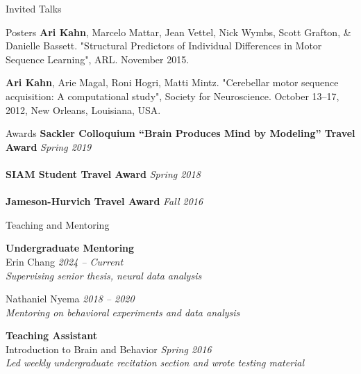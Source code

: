 \documentclass{resume} %
\begin{document}
\begin{rSection}{Invited Talks}
\begin{rSection}{Posters}
\textbf{Ari Kahn}, Marcelo Mattar, Jean Vettel, Nick Wymbs, Scott Grafton, \& Danielle Bassett. "Structural Predictors of Individual Differences in Motor Sequence Learning", ARL. November 2015.

\textbf{Ari Kahn}, Arie Magal, Roni Hogri, Matti Mintz. "Cerebellar motor sequence acquisition: A computational study", Society for Neuroscience. October 13--17, 2012, New Orleans, Louisiana, USA.
\end{rSection}

\end{rSection}

\begin{rSection}{Awards}
    \textbf{Sackler Colloquium ``Brain Produces Mind by Modeling'' Travel Award} \hfill \emph{Spring 2019} \\
    \\
    \textbf{SIAM Student Travel Award} \hfill \emph{Spring 2018} \\
    \\
    \textbf{Jameson-Hurvich Travel Award} \hfill \emph{Fall 2016} \\
\end{rSection}


\begin{rSection}{Teaching and Mentoring}

\textbf{Undergraduate Mentoring} \\
Erin Chang \hfill \emph{2024 -- Current} \\
\emph{Supervising senior thesis, neural data analysis}

Nathaniel Nyema \hfill \emph{2018 -- 2020} \\
\emph{Mentoring on behavioral experiments and data analysis}

\textbf{Teaching Assistant} \\
Introduction to Brain and Behavior \hfill \emph{Spring 2016} \\
\emph{Led weekly undergraduate recitation section and wrote testing material}

\end{rSection}
\end{document}
